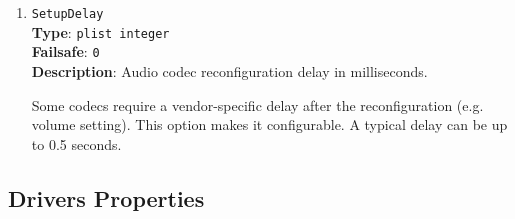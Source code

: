 \documentclass[]{article}
\begin{document}
\begin{enumerate}
  AppleHDA kext will function correctly only if \texttt{TCSEL} register is configured
  to use \texttt{TC0} traffic class. Refer to Intel I/O Controller Hub 9 (ICH9) Family
  Datasheet (or any other ICH datasheet) for more details about this register.

  \emph{Note}: This option is independent from \texttt{AudioSupport}. If AppleALC is used
  it is preferred to use AppleALC \texttt{alctcsel} property instead.

\item
  \texttt{SetupDelay}\\
  \textbf{Type}: \texttt{plist\ integer}\\
  \textbf{Failsafe}: \texttt{0}\\
  \textbf{Description}: Audio codec reconfiguration delay in milliseconds.

  Some codecs require a vendor-specific delay after the reconfiguration
  (e.g. volume setting). This option makes it configurable. A typical
  delay can be up to 0.5 seconds.

\end{enumerate}

\subsection{Drivers Properties}\label{uefidriversprops}
\end{document}
